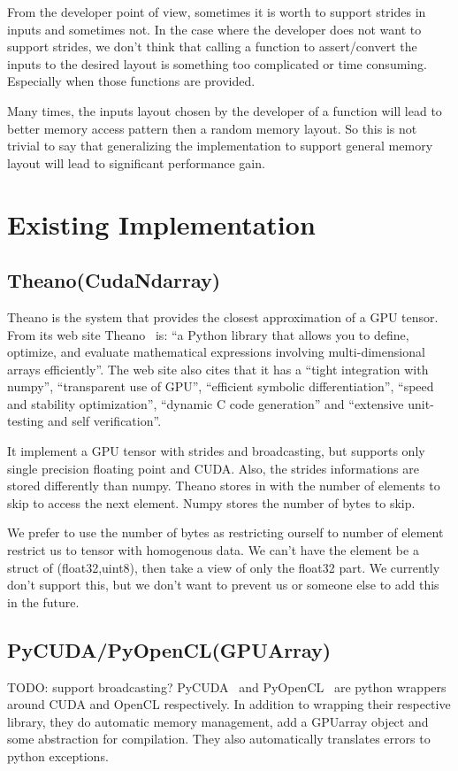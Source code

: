 \documentclass{article} %
\begin{document}
From the developer point of view, sometimes it is worth to support
strides in inputs and sometimes not.  In the case where the developer does not want to support strides, we don't think
that calling a function to assert/convert the inputs to the desired layout is something too complicated or time consuming.
Especially when those functions are provided.

Many times, the inputs layout chosen by the developer of a function
will lead to better memory access pattern then a random memory
layout. So this is not trivial to say that generalizing the
implementation to support general memory layout will lead to
significant performance gain. 

\section{Existing Implementation}
\subsection{Theano(CudaNdarray)}
Theano is the system that provides the closest approximation of a GPU tensor. From its web site Theano~\citep{bergstra+al:2010-scipy} is:
``a Python library that allows you to define, optimize, and evaluate mathematical expressions involving multi-dimensional arrays efficiently''. The web site also cites that it has a ``tight integration with numpy'', ``transparent use of GPU'', ``efficient symbolic differentiation'', ``speed and stability optimization'', ``dynamic C code generation'' and ``extensive unit-testing and self verification''.

It implement a GPU tensor with strides and broadcasting, but supports only single precision floating point and CUDA. Also, the strides informations are stored differently than numpy. Theano stores in with the number of elements to skip to access the next element. Numpy stores the number of bytes to skip.

We prefer to use the number of bytes as restricting ourself to number of element restrict us to tensor with homogenous data. We can't have the element be a struct of (float32,uint8), then take a view of only the float32 part. We currently don't support this, but we don't want to prevent us or someone else to add this in the future.

\subsection{PyCUDA/PyOpenCL(GPUArray)}
TODO: support broadcasting?
PyCUDA~\citep{kloeckner_pycuda_2009} and PyOpenCL~\citep{kloeckner_pycuda_2009} are python wrappers around CUDA and OpenCL respectively. In addition to wrapping their respective library, they do automatic memory management, add a GPUarray object and some abstraction for compilation. They also automatically translates errors to python exceptions.
\end{document}
